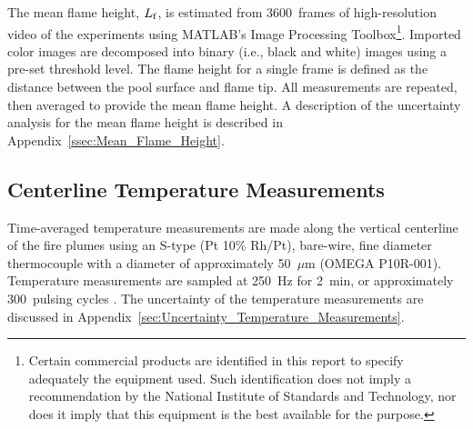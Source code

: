 \documentclass[12pt]{article}
\begin{document}
The mean flame height, $L_{\rm{f}}$, is estimated from 3600~frames of high-resolution video of the experiments using MATLAB’s Image Processing Toolbox\footnote{\label{fn:product} Certain commercial products are identified in this report to specify adequately the equipment used. Such identification does not imply a recommendation by the National Institute of Standards and Technology, nor does it imply that this equipment is the best available for the purpose.}. Imported color images are decomposed into binary (i.e., black and white) images using a pre-set threshold level. The flame height for a single frame is defined as the distance between the pool surface and flame tip. All measurements are repeated, then averaged to provide the mean flame height. A description of the uncertainty analysis for the mean flame height is described in Appendix~\ref{ssec:Mean_Flame_Height}.

\subsection{Centerline Temperature Measurements}
\label{ssec:Temperature_Measurements}

Time-averaged temperature measurements are made along the vertical centerline of the fire plumes using an S-type (Pt 10\% Rh/Pt), bare-wire, fine diameter thermocouple with a diameter of approximately 50~$\mu$m (OMEGA P10R-001). Temperature measurements are sampled at \SI{250}{Hz} for \SI{2}{min}, or approximately 300~pulsing cycles \cite{Wang2019}. The uncertainty of the temperature measurements are discussed in Appendix~\ref{sec:Uncertainty_Temperature_Measurements}.
\end{document}

